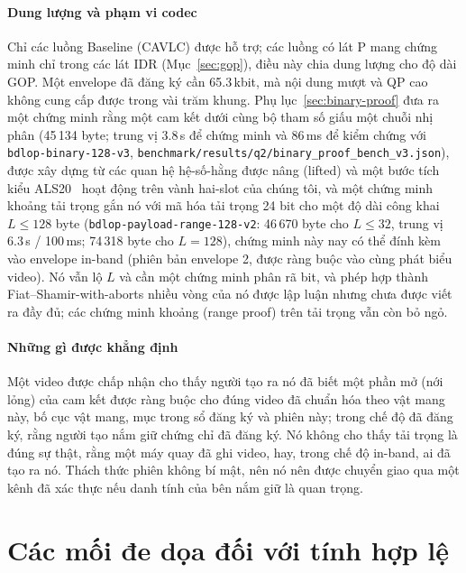 \documentclass[journal]{IEEEtran}
\begin{document}
\paragraph{Dung lượng và phạm vi codec} Chỉ các luồng Baseline (CAVLC) được hỗ
trợ; các luồng có lát P mang chứng minh chỉ trong các lát IDR
(Mục~\ref{sec:gop}), điều này chia dung lượng cho độ dài GOP. Một envelope đã
đăng ký cần 65.3\,kbit, mà nội dung mượt và QP cao không cung cấp được trong vài
trăm khung. Phụ lục~\ref{sec:binary-proof} đưa ra một chứng minh rằng một cam
kết dưới cùng bộ tham số giấu một chuỗi nhị phân (45\,134 byte; trung vị 3.8\,s
để chứng minh và 86\,ms để kiểm chứng với \texttt{bdlop-binary-128-v3},
\texttt{benchmark/results/q2/binary\_proof\_bench\_v3.json}), được
xây dựng từ các quan hệ hệ-số-hằng được nâng (lifted) và một bước tích kiểu
ALS20~\cite{ref:als20,ref:lnp22} hoạt động trên vành hai-slot của chúng tôi, và
một chứng minh khoảng tải trọng gắn nó với mã hóa tải trọng 24 bit cho một độ
dài công khai $L\le128$ byte (\texttt{bdlop-payload-range-128-v2}: 46\,670 byte
cho $L\le32$, trung vị 6.3\,s / 100\,ms; 74\,318 byte cho $L=128$), chứng minh
này nay có thể đính kèm vào envelope in-band (phiên bản envelope 2, được ràng
buộc vào cùng phát biểu video). Nó vẫn lộ $L$ và cần một chứng minh phân rã
bit, và phép hợp thành Fiat--Shamir-with-aborts nhiều vòng của nó được lập luận
nhưng chưa được viết ra đầy đủ; các chứng minh khoảng (range proof) trên tải
trọng vẫn còn bỏ ngỏ.

\paragraph{Những gì được khẳng định} Một video được chấp nhận cho thấy người tạo
ra nó đã biết một phần mở (nới lỏng) của cam kết được ràng buộc cho đúng video
đã chuẩn hóa theo vật mang này, bố cục vật mang, mục trong sổ đăng ký và phiên
này; trong chế độ đã đăng ký, rằng người tạo nắm giữ chứng chỉ đã đăng ký. Nó
không cho thấy tải trọng là đúng sự thật, rằng một máy quay đã ghi video, hay,
trong chế độ in-band, ai đã tạo ra nó. Thách thức phiên không bí mật, nên nó nên
được chuyển giao qua một kênh đã xác thực nếu danh tính của bên nắm giữ là quan
trọng.

\section{Các mối đe dọa đối với tính hợp lệ}
\label{sec:threats}
\end{document}

